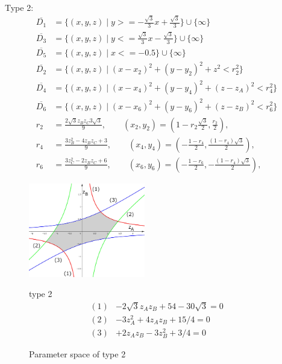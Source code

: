 \documentclass[suppldata, dvipdfmx]{interact}
\theoremstyle{plain}%
\theoremstyle{definition}
\theoremstyle{remark}
\theoremstyle{problemstyle}
\begin{document}
\bigskip\par
Type 2:%
\begin{align*}
\overline{D_1}&=\{(x,y,z) \mid y >= -\frac{\sqrt{3}}{3}x + \frac{\sqrt{3}}{3}\} \cup \{ \infty \}\\
\overline{D_3}&=\{(x,y,z) \mid y <= \frac{\sqrt{3}}{3}x - \frac{\sqrt{3}}{3} \} \cup\{\infty\}\\
\overline{D_5}&=\{(x,y,z) \mid x <= -0.5 \} \cup\{\infty\}\\
\overline{D_2}&=\{(x,y,z) \mid (x-x_2)^2+(y-y_2)^2+z^2<r_2^2 \} \\
\overline{D_4}&=\{(x,y,z) \mid (x-x_4)^2+(y-y_4)^2+(z-z_A)^2<r_4^2 \} \\
\overline{D_6}&=\{(x,y,z) \mid (x-x_6)^2+(y-y_6)^2+(z-z_B)^2<r_6^2 \} \\
 r_2 &= \frac{2\sqrt{3}z_Bz_C 3\sqrt{3}}{9},  \qquad
(x_2, y_2) = \left(1-r_2\frac{\sqrt{3}}{2}, \frac{r_2}{2}\right),\\
 r_4 &= \frac{3z_B^2 - 4z_Bz_C + 3}{9}, \qquad
 (x_4, y_4) = \left(-\frac{1 - r_4}{2}, \frac{(1 - r_4)\sqrt{3}}{2}\right),\\
 r_6 &= \frac{3z_C^2 -2z_Bz_C + 6}{9}, \qquad
(x_6, y_6) = \left(-\frac{1 - r_6}{2}, -\frac{(1 - r_4)\sqrt{3}}{2}\right),
\end{align*} 
\begin{figure}[h]
 \begin{minipage}[]{0.5\textwidth}
 \centering
 \includegraphics[width=2in,
 keepaspectratio]{./img/graph/cubeB.jpg}
 \caption{Parameter space of type 2}
 \label{fig:graphCubeB}
 \end{minipage}
 \hspace*{\fill}
 \begin{minipage}[]{0.5\textwidth}
  type 2
  \centering
  \begin{align*}
   (1)& -2\sqrt{3} z_A z_B + 54 - 30\sqrt{3} = 0\\
   (2)& -3z_A^2 + 4 z_A z_B + 15/4 = 0\\
   (3)& +2z_A z_B - 3z_B^2 + 3/4 = 0
  \end{align*}
 \end{minipage}
\end{figure}
\end{document}
